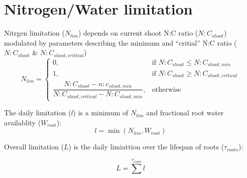 \section{Nitrogen/Water limitation}

Nitrgen limitation ($N_{lim}$) depends on current shoot N:C ratio ($N:C_{shoot}$) modulated by parameters describing the minimum and ``critial'' N:C ratio ($N:C_{shoot}$ \& $N:C_{shoot,critical}$)
\begin{equation}
	N_{lim}=
	\begin{cases}
	    0,& \text{if } N:C_{shoot}\le N:C_{shoot,min} \\
	    1,& \text{if } N:C_{shoot}\ge N:C_{shoot,critical} \\
	    \dfrac{N:C_{shoot} - n:c_{shoot,min}}{N:C_{shoot,critical} - N:C_{shoot,min}},& \text{otherwise}
	\end{cases}
\end{equation}

The daily limitation  ($l$) is a minimum of $N_{lim}$ and fractional root water availablity ($W_{root}$):
\begin{equation}
	l = \min (N_{lim}, W_{root})
\end{equation}

Overall limitation ($L$) is the daily limiattion over the lifespan of roots ($\tau_{roots}$):

\begin{equation}
	L = \sum^{\tau_{roots}} l
\end{equation}
